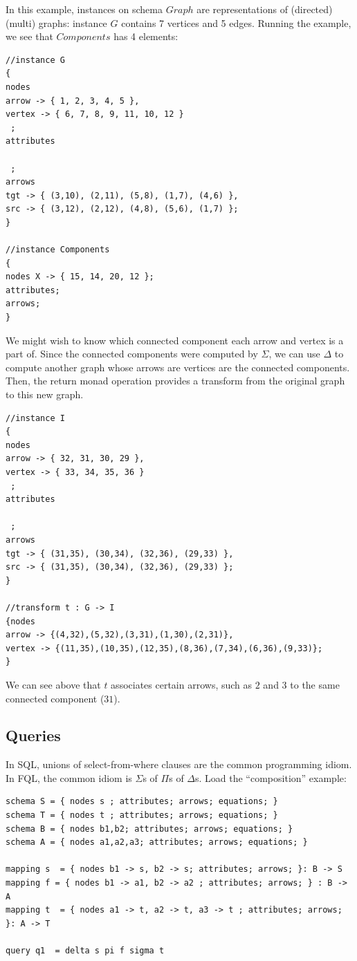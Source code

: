 \documentclass[12pt]{article}
\begin{document}
In this example, instances on schema $Graph$ are representations of (directed) (multi) graphs: instance $G$ contains 7 vertices and 5 edges.  Running the example, we see that $Components$ has 4 elements:
\begin{verbatim}
//instance G
{
nodes
arrow -> { 1, 2, 3, 4, 5 },
vertex -> { 6, 7, 8, 9, 11, 10, 12 }
 ;
attributes

 ;
arrows
tgt -> { (3,10), (2,11), (5,8), (1,7), (4,6) },
src -> { (3,12), (2,12), (4,8), (5,6), (1,7) };
}

//instance Components
{
nodes X -> { 15, 14, 20, 12 };
attributes;
arrows;
}
\end{verbatim}
We might wish to know which connected component each arrow and vertex is a part of.  Since the connected components were computed by $\Sigma$, we can use $\Delta$ to compute another graph whose arrows are vertices are the connected components.  Then, the return monad operation provides a transform from the original graph to this new graph. 
\begin{verbatim}
//instance I
{
nodes
arrow -> { 32, 31, 30, 29 },
vertex -> { 33, 34, 35, 36 }
 ;
attributes

 ;
arrows
tgt -> { (31,35), (30,34), (32,36), (29,33) },
src -> { (31,35), (30,34), (32,36), (29,33) };
}

//transform t : G -> I
{nodes
arrow -> {(4,32),(5,32),(3,31),(1,30),(2,31)},
vertex -> {(11,35),(10,35),(12,35),(8,36),(7,34),(6,36),(9,33)};
}
\end{verbatim}
We can see above that $t$ associates certain arrows, such as $2$ and $3$ to the same connected component ($31$).

\subsection{Queries}
In SQL, unions of select-from-where clauses are the common programming idiom.  In FQL, the common idiom is $\Sigma$s of $\Pi$s of $\Delta$s.  Load the ``composition'' example:

\begin{verbatim}
schema S = { nodes s ; attributes; arrows; equations; }
schema T = { nodes t ; attributes; arrows; equations; }
schema B = { nodes b1,b2; attributes; arrows; equations; }
schema A = { nodes a1,a2,a3; attributes; arrows; equations; }

mapping s  = { nodes b1 -> s, b2 -> s; attributes; arrows; }: B -> S
mapping f = { nodes b1 -> a1, b2 -> a2 ; attributes; arrows; } : B -> A
mapping t  = { nodes a1 -> t, a2 -> t, a3 -> t ; attributes; arrows; }: A -> T

query q1  = delta s pi f sigma t
\end{verbatim}
\end{document}
